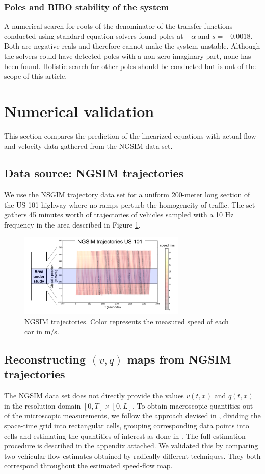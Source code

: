 \documentclass[letterpaper, 10 pt, conference]{ieeeconf}  %
\begin{document}
\subsubsection{Poles and BIBO stability of the system}
A numerical search for roots of the denominator of the transfer functions conducted using standard equation solvers found poles at $-\alpha$ and $s=-0.0018$. Both are negative reals and therefore cannot make the system unstable. Although the solvers could have detected poles with a non zero imaginary part, none has been found. Holistic search for other poles should be conducted but is out of the scope of this article.


\section{Numerical validation}
This section compares the prediction of the linearized equations with actual flow and velocity data gathered from the NGSIM data set.


\subsection{Data source: NGSIM trajectories}
We use the NSGIM trajectory data set for a uniform 200-meter long section of the US-101 highway where no ramps perturb the homogeneity of traffic. The set gathers 45 minutes worth of trajectories of vehicles sampled with a 10 Hz frequency in the area described in Figure \ref{fig:NGSIM-trajectories}.
\begin{figure}
\centering
\includegraphics[width=8cm, trim = 25mm 25mm 30mm 10mm]{US-101_all_traj_low_res_mod}
\protect\caption{NGSIM trajectories. Color represents the measured speed of each
car in m/s.}
\label{fig:NGSIM-trajectories}
\end{figure}

\subsection{Reconstructing $(v,q)$ maps from NGSIM trajectories}
The NGSIM data set does not directly provide the values $v(t,x)$ and $q(t,x)$ in the resolution domain $\left[0,T\right]\times\left[0,L\right]$. To obtain macroscopic quantities out of the microscopic measurements, we follow the approach devised in \cite{edie1963discussion}, dividing the space-time grid into rectangular cells, grouping corresponding data points into cells and estimating the quantities of interest as done in \cite{Piccoli201532}. The full estimation procedure is described in the appendix attached. We validated this by comparing two vehicular flow estimates obtained by radically different techniques. They both correspond throughout the estimated speed-flow map.
\end{document}
